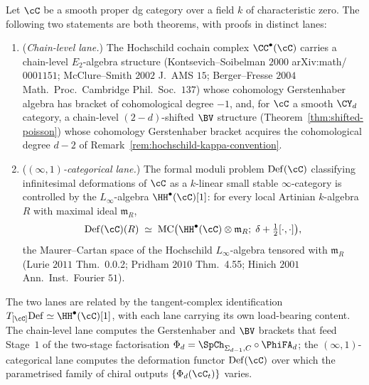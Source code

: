 \begin{theorem}
\label{thm:two-grammar-hh-def}
Let $\cC$ be a smooth proper dg category over a field $k$ of
characteristic zero. The following two statements are both theorems,
with proofs in distinct lanes:
\begin{enumerate}[label=(\alph*),leftmargin=1.5em]
 \item (\emph{Chain-level lane.}) The Hochschild cochain complex
 $\CC^\bullet(\cC)$ carries a chain-level $E_2$-algebra structure
 (Kontsevich--Soibelman $2000$ arXiv:math/$0001151$; McClure--Smith
 $2002$ J.\ AMS $15$; Berger--Fresse $2004$ Math.\ Proc.\ Cambridge
 Phil.\ Soc.\ $137$) whose cohomology Gerstenhaber algebra has bracket
 of cohomological degree $-1$, and, for $\cC$ a smooth $\CY_d$ category,
 a chain-level $(2-d)$-shifted $\BV$ structure
 (Theorem~\ref{thm:shifted-poisson}) whose cohomology Gerstenhaber
 bracket acquires the cohomological degree $d-2$ of
 Remark~\ref{rem:hochschild-kappa-convention}.
 \item (\emph{$(\infty,1)$-categorical lane.}) The formal moduli
 problem $\mathrm{Def}(\cC)$ classifying infinitesimal deformations of
 $\cC$ as a $k$-linear small stable $\infty$-category is controlled by
 the $L_\infty$-algebra $\HH^\bullet(\cC)[1]$: for every local Artinian
 $k$-algebra $R$ with maximal ideal $\mathfrak m_R$,
 \[
 \mathrm{Def}(\cC)(R)\;\simeq\;
 \mathrm{MC}\bigl(\HH^\bullet(\cC)\otimes\mathfrak m_R;\; \delta + \tfrac12[\cdot,\cdot]\bigr),
 \]
 the Maurer--Cartan space of the Hochschild $L_\infty$-algebra tensored
 with $\mathfrak m_R$ (Lurie $2011$ Thm.~0.0.2; Pridham $2010$ Thm.~4.55;
 Hinich $2001$ Ann.\ Inst.\ Fourier $51$).
\end{enumerate}
The two lanes are related by the tangent-complex identification
$T_{[\cC]}\mathrm{Def}\simeq\HH^\bullet(\cC)[1]$, with each lane
carrying its own load-bearing content. The chain-level lane computes
the Gerstenhaber and $\BV$ brackets that feed Stage~$1$ of the
two-stage factorisation
$\Phi_d=\SpCh_{\Sigma_{d-1},C}\circ\PhiFA_d$; the
$(\infty,1)$-categorical lane computes the deformation functor
$\mathrm{Def}(\cC)$ over which the parametrised family of chiral
outputs $\{\Phi_d(\cC_t)\}$ varies.
\end{theorem}

